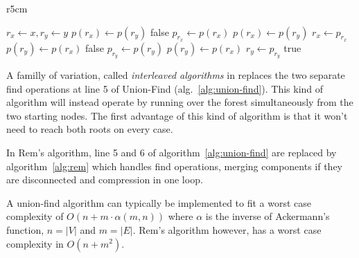 \documentclass[12px]{article}
\begin{document}
        \setlength\intextsep{0pt}
        \begin{wrapfigure}[17]{r}{5cm}
          \centering
          \begin{minipage}{\linewidth}
            \begin{algorithm}[H]
              \caption{Rem's algorithm}%
              \label{alg:rem}
              \begin{algorithmic}[1]
                \State $r_x \gets x, r_y \gets y$
                      \State $p(r_x) \gets p(r_y)$
                      \State \Return false
                    \EndIf
                    \State $p_{r_x} \gets p(r_x)$
                    \State $p(r_x) \gets p(r_y)$
                    \State $r_x \gets p_{r_x}$
                  \Else
                      \State $p(r_y) \gets p(r_x)$
                      \State \Return false
                    \EndIf
                    \State $p_{r_y} \gets p(r_y)$
                    \State $p(r_y) \gets p(r_x)$
                    \State $r_y \gets p_{r_y}$
                  \EndIf
                \EndWhile
                \State \Return true
              \end{algorithmic}
            \end{algorithm}
          \end{minipage}
        \end{wrapfigure}

        A familly of variation, called \emph{interleaved algorithms} in  replaces the two separate find operations at line 5 of Union-Find (alg.~\ref{alg:union-find}). This kind of algorithm will instead operate by running over the forest simultaneously from the two starting nodes. The first advantage of this kind of algorithm is that it won't need to reach both roots on every case.

      In Rem's algorithm, line 5 and 6 of algorithm~\ref{alg:union-find} are replaced by algorithm~\ref{alg:rem} which handles find operations, merging components if they are disconnected and compression in one loop.

      A union-find algorithm can typically be implemented to fit a worst case complexity of $O(n + m \cdot \alpha(m, n))$ where $\alpha$ is the inverse of Ackermann's function, $n = |V|$ and $m = |E|$. Rem's algorithm however, has a worst case complexity in $O(n + m^2)$.
\end{document}

